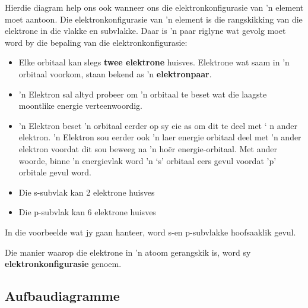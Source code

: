 Hierdie diagram help ons ook wanneer ons die elektronkonfigurasie van 'n element moet aantoon. Die elektronkonfigurasie van 'n element is die rangskikking van die elektrone in die vlakke en subvlakke. Daar is 'n paar riglyne wat gevolg moet word by die bepaling van die elektronkonfigurasie:
\par 
\begin{itemize}[noitemsep]
\item Elke orbitaal kan slegs \textbf{twee elektrone} huisves. Elektrone wat saam in 'n orbitaal voorkom, staan bekend as  'n \textbf{elektronpaar}.
\item 'n Elektron sal altyd probeer om 'n orbitaal te beset wat die laagste moontlike energie ver\-teen\-woor\-dig.
\item 'n Elektron beset 'n orbitaal eerder op sy eie as om dit te deel met ‘ n ander elektron. 'n Elektron sou eerder ook 'n laer energie orbitaal deel met 'n ander elektron voordat dit sou beweeg na 'n hoër energie-orbitaal. Met ander woorde, binne 'n energievlak word  'n ‘s' orbitaal eers gevul voordat 'p' orbitale gevul word.
\item Die s-subvlak kan 2 elektrone huisves
\item Die p-subvlak kan 6 elektrone huisves
\end{itemize}
In die voorbeelde wat jy gaan hanteer, word s-en p-subvlakke hoofsaaklik gevul.
\par 
Die manier waarop die elektrone in 'n atoom gerangskik is, word sy \textbf{elektronkonfigurasie} genoem.\par 




\subsection*{Aufbaudiagramme}        
\label{m38741*id259628}

